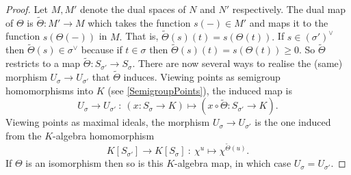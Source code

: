 \documentclass[BSc]{usydthesis}
\numberwithin{equation}{chapter}
\theoremstyle{remark}
\newcommand{\V}{\vee}
\begin{document}
\begin{proof} Let $M, M'$ denote the dual spaces of $N$ and $N'$ respectively. The dual map of $\Theta$ is $\tilde{\Theta}:M'\to M$ which takes the function $s(-)\in M'$ and maps it to the function $s(\Theta(-))$ in $M.$ That is, $\tilde{\Theta}(s)(t) = s(\Theta(t)).$ If $s\in (\sigma')^{\V}$ then $\tilde{\Theta}(s)\in \sigma^{\V}$ because if $t\in \sigma$ then $\tilde{\Theta}(s)(t) = s(\Theta(t)) \geq 0.$ So $\tilde{\Theta}$ restricts to a map $\tilde{\Theta}:S_{\sigma'}\to S_{\sigma}.$ There are now several ways to realise the (same) morphism $U_{\sigma}\to U_{\sigma'}$ that $\tilde{\Theta}$ induces. Viewing points as semigroup homomorphisms into $K$ (see \ref{SemigroupPoints}), the induced map is $$ U_{\sigma} \to U_{\sigma'}\ : \ ( x: S_{\sigma} \rightarrow K ) \mapsto ( x\circ \tilde{\Theta}: S_{\sigma'} \rightarrow K ).$$ Viewing points as maximal ideals, the morphism $U_{\sigma}\to U_{\sigma'}$ is the one induced from the $K$-algebra homomorphism $$ K[S_{\sigma'}] \to K[S_{\sigma}]\ : \  \chi^u \mapsto \chi^{\tilde{\Theta}(u)}.$$ If $\Theta$ is an isomorphism then so is this $K$-algebra map, in which case $U_{\sigma} = U_{\sigma'}.$
\end{proof}
\end{document}
